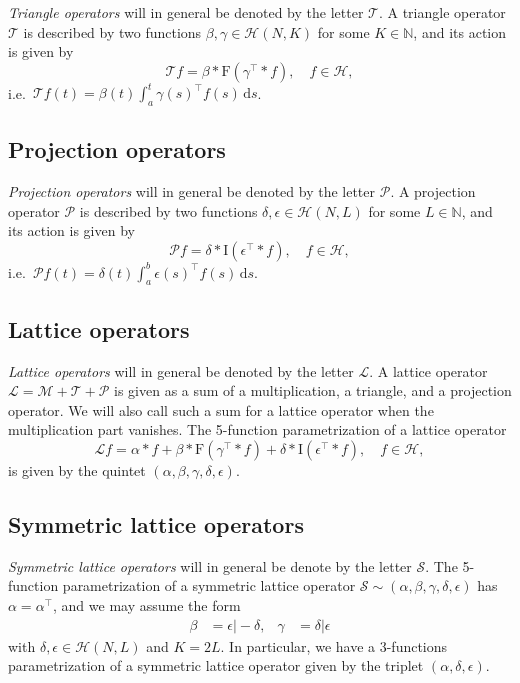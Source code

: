\documentclass[12pt,a4paper]{article}
\newcommand{\Nset}{\mathbb{N}}
\newcommand{\df}{\text{d}}
\newcommand{\Mop}{\mathcal{M}}
\newcommand{\Top}{\mathcal{T}}
\newcommand{\Pop}{\mathcal{P}}
\newcommand{\Lop}{\mathcal{L}}
\newcommand{\Sop}{\mathcal{S}}
\begin{document}
\emph{Triangle operators} will in general be denoted by the letter $\Top$. A triangle operator $\Top$ is described by two functions $\beta, \gamma \in \mathcal{H}(N,K)$ for some $K \in \Nset$, and its action is given by
\begin{equation}
\Top f = \beta * \mathrm{F}(\gamma^\top * f), \quad f \in \mathcal{H},
\end{equation} 
i.e.\ $\Top f(t) = \beta(t) \int_a^t \gamma(s)^\top f(s)\, \df s$.

\subsection{Projection operators} \label{sec:P}

\emph{Projection operators} will in general be denoted by the letter $\Pop$. A projection operator $\Pop$ is described by two functions $\delta, \epsilon \in \mathcal{H}(N,L)$ for some $L \in \Nset$, and its action is given by
\begin{equation}
\Pop f = \delta * \mathrm{I}(\epsilon^\top * f), \quad f \in \mathcal{H},
\end{equation} 
i.e.\ $\Pop f(t) =  \delta(t) \int_a^b \epsilon(s)^\top f(s)\, \df s$.

\subsection{Lattice operators} \label{sec:L}

\emph{Lattice operators} will in general be denoted by the letter $\Lop$. A lattice operator $\Lop = \Mop + \Top + \Pop$ is given as a sum of a multiplication, a triangle, and a projection operator. We will also call such a sum for a lattice operator when the multiplication part vanishes. The 5-function parametrization of a lattice operator
\begin{equation}
\Lop f = \alpha * f + \beta * \mathrm{F}(\gamma^\top * f) + \delta * \mathrm{I}(\epsilon^\top * f), \quad f \in \mathcal{H},
\end{equation}
is given by the quintet $(\alpha,\beta,\gamma,\delta,\epsilon)$. 

\subsection{Symmetric lattice operators} \label{sec:S}

\emph{Symmetric lattice operators} will in general be denote by the letter $\Sop$. The 5-function parametrization of a symmetric lattice operator $\Sop \sim (\alpha,\beta,\gamma,\delta,\epsilon)$ has $\alpha=\alpha^\top$, and we may assume the form 
\begin{align*}
\beta &= \epsilon \vert -\delta, &
\gamma &= \delta \vert \epsilon
\end{align*}
with $\delta, \epsilon \in \mathcal{H}(N,L)$ and $K=2L$. In particular, we have a 3-functions parametrization of a symmetric lattice operator given by the triplet $(\alpha, \delta, \epsilon)$.
\end{document}

